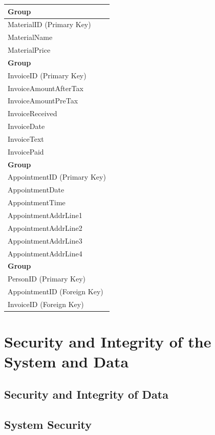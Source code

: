 \begin{flushleft}
\begin{longtable}{|p{12cm}|}
			\textbf{Group} \\ \hline
			MaterialID (Primary Key) \\
			MaterialName \\
			MaterialPrice \\ \hline


			\textbf{Group} \\ \hline
			InvoiceID (Primary Key) \\
			InvoiceAmountAfterTax \\
			InvoiceAmountPreTax \\
			InvoiceReceived \\
			InvoiceDate \\ 
			InvoiceText \\
			InvoicePaid \\	\hline

		\textbf{Group} \\ \hline 
			AppointmentID (Primary Key) \\
			AppointmentDate \\
			AppointmentTime \\
			AppointmentAddrLine1 \\
			AppointmentAddrLine2 \\
			AppointmentAddrLine3	\\
			AppointmentAddrLine4 \\ \hline


			\textbf{Group} \\ \hline
			PersonID (Primary Key) \\
			AppointmentID (Foreign Key) \\
			InvoiceID (Foreign Key) \\ \hline

			
    \end{longtable}
\end{flushleft}




\section{Security and Integrity of the System and Data}

\subsection{Security and Integrity of Data}

\subsection{System Security}

